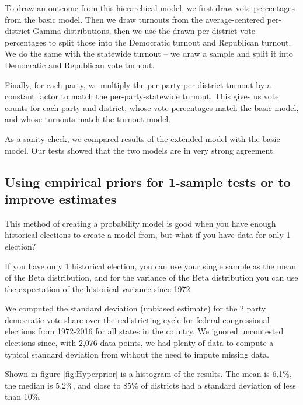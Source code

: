 \documentclass[preprint,12pt]{article}
\begin{document}
To draw an outcome from this hierarchical model, we first draw vote percentages from the basic model. Then we draw turnouts from the average-centered per-district Gamma distributions, then we use the drawn per-district vote percentages to split those into the Democratic turnout and Republican turnout.  We do the same with the statewide turnout -- we draw a sample and split it into Democratic and Republican vote turnout. 
 
Finally, for each party, we multiply the per-party-per-district turnout by a constant factor to match the per-party-statewide turnout.  This gives us vote counts for each party and district, whose vote percentages match the basic model, and whose turnouts match the turnout model.
 
As a sanity check, we compared results of the extended model with the basic model.  Our tests showed that the two models are in very strong agreement. 
 
 
\subsection{Using empirical priors for 1-sample tests or to improve estimates}
 
This method of creating a probability model is good when you have enough historical elections to create a model from, but what if you have data for only 1 election?
 
If you have only 1 historical election, you can use your single sample as the mean of the Beta distribution, and for the variance of the Beta distribution you can use the expectation of the historical variance since 1972.
 
We computed the standard deviation (unbiased estimate) for the 2 party democratic vote share over the redistricting cycle for federal congressional elections from 1972-2016 for all states in the country. We ignored uncontested elections since, with 2,076 data points, we had plenty of data to compute a typical standard deviation from without the need to impute missing data.
 
Shown in figure \ref{fig:Hyperprior} is a histogram of the results.  The mean is 6.1\%, the median is 5.2\%, and close to 85\% of districts had a standard deviation of less than 10\%. 
\end{document}

